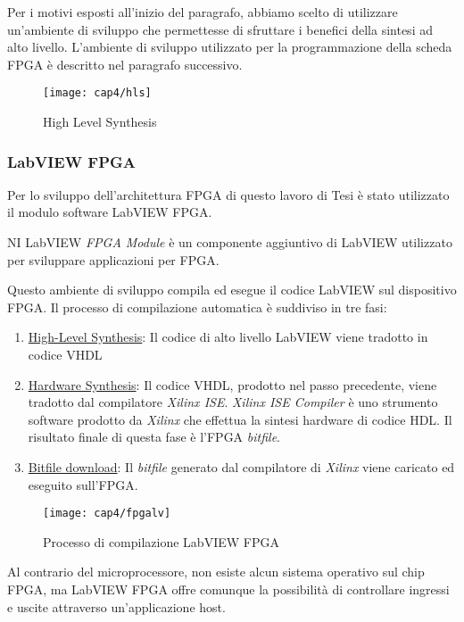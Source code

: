 Per i motivi esposti all'inizio del paragrafo, abbiamo scelto di utilizzare un'ambiente di sviluppo che permettesse di sfruttare i benefici della sintesi ad alto livello. L'ambiente di sviluppo utilizzato per la programmazione della scheda FPGA è descritto nel paragrafo successivo.

\begin{figure}  
  \begin{center}
    \texttt{[image: cap4/hls]}
    \caption{High Level Synthesis}
  \end{center}
\end{figure}
		
\subsubsection{LabVIEW FPGA}
Per lo sviluppo dell'architettura FPGA di questo lavoro di Tesi è stato utilizzato il modulo software LabVIEW FPGA. 

NI LabVIEW \textit{FPGA Module} è un componente aggiuntivo di LabVIEW utilizzato per sviluppare applicazioni per FPGA.

Questo ambiente di sviluppo compila ed esegue il codice LabVIEW sul dispositivo FPGA. Il processo di compilazione automatica è suddiviso in tre fasi:
\begin{enumerate}
	\item \underline{High-Level Synthesis}: Il codice di alto livello LabVIEW viene tradotto in codice VHDL
	\item \underline{Hardware Synthesis}: Il codice VHDL, prodotto nel passo precedente, viene tradotto dal compilatore \textit{Xilinx ISE}. \textit{Xilinx ISE Compiler} è uno strumento software prodotto da \textit{Xilinx} che effettua la sintesi hardware di codice HDL. Il risultato finale di questa fase è l'FPGA \textit{bitfile}.
	\item \underline{Bitfile download}: Il \textit{bitfile} generato dal compilatore di \textit{Xilinx} viene caricato ed eseguito sull'FPGA.
\end{enumerate}

\begin{figure}  
  \begin{center}
    \texttt{[image: cap4/fpgalv]}
    \caption{Processo di compilazione LabVIEW FPGA}
  \end{center}
\end{figure}

Al contrario del microprocessore, non esiste alcun sistema operativo sul chip FPGA, ma LabVIEW FPGA offre comunque la possibilità di controllare ingressi e uscite attraverso un'applicazione host.

